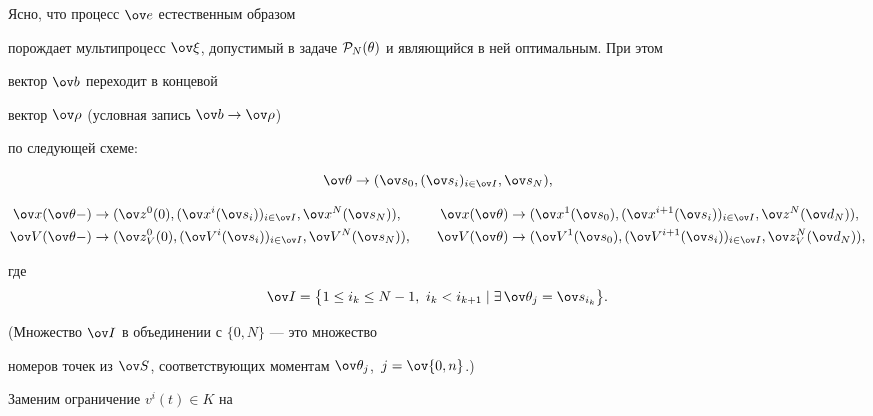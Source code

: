 Ясно, что процесс $\ov e$ естественным образом


порождает мультипроцесс $\ov \xi$, допустимый в задаче ${\cal


P}_N(\theta)$ и являющийся в ней оптимальным. При этом


вектор $\ov b$ переходит в концевой


вектор $\ov\rho$ (условная запись $\ov b\rightarrow \ov\rho$)


по следующей схеме:


$$\ov\theta \rightarrow (\ov s_0,(\ov s_i)_{i\in \ov I},\ov s_N),


$$


\begin{alignat*}{2}


\ov x(\ov\theta-) &\rightarrow (\ov


z^0( 0),(\ov x^{i}(\ov s_i))_{i\in \ov I},\ov


x^N(\ov s_N)), &\quad \ov x(\ov\theta)


&\rightarrow (\ov x^1(\ov s_0),(\ov


x^{i+1}(\ov s_i))_{i\in \ov I},\ov z^{N}(\ov


d_N)), \\


%


\ov V(\ov\theta-) &\rightarrow


(\ov z_V^0( 0),(\ov V^{i}(\ov s_i))_{i\in \ov


I},\ov V^N(\ov s_N)), &\quad \ov


V(\ov\theta) &\rightarrow (\ov V^1(\ov


s_0),(\ov V^{i+1}(\ov s_i))_{i\in \ov I},\ov


z_V^N(\ov d_N)),


\end{alignat*}


где $$


\ov


I=\big\{1\leq i_k\leq N-1,\ i_k<i_{k+1}\mid \exists \,


\ov\theta_j = \ov s_{i_k} \big\}.


$$


(Множество $\ov I$ в объединении с $\{0,N\}$ --- это множество


номеров точек из $\ov S$, соответствующих моментам $\ov


\theta_j$,\ $j=\ov{0,n}$.)





Заменим ограничение $v^i(t)\in K$ на



